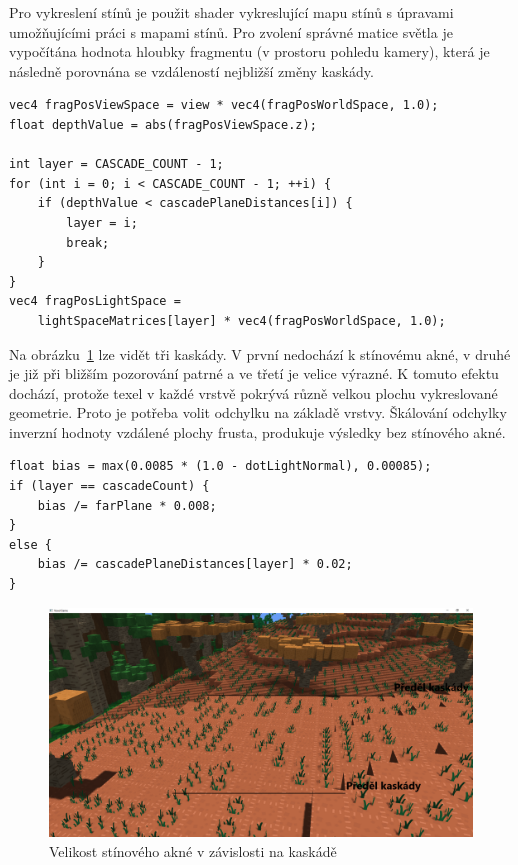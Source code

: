 \documentclass[thesis=M,czech]{FITthesis}[2019/12/23]
\begin{document}
Pro vykreslení stínů je použit shader vykreslující mapu stínů s úpravami umožňujícími práci s mapami stínů. Pro zvolení správné matice světla je vypočítána hodnota hloubky fragmentu (v prostoru pohledu kamery), která je následně porovnána se vzdáleností nejbližší změny kaskády.

\begin{verbatim}
vec4 fragPosViewSpace = view * vec4(fragPosWorldSpace, 1.0);
float depthValue = abs(fragPosViewSpace.z);

int layer = CASCADE_COUNT - 1;
for (int i = 0; i < CASCADE_COUNT - 1; ++i) {
    if (depthValue < cascadePlaneDistances[i]) {
        layer = i;
        break;
    }
}
vec4 fragPosLightSpace = 
    lightSpaceMatrices[layer] * vec4(fragPosWorldSpace, 1.0);
\end{verbatim}

Na obrázku~\ref{fig:shadows_csm_acne} lze vidět tři kaskády. V první nedochází k stínovému akné, v druhé je již při bližším pozorování patrné a ve třetí je velice výrazné. K tomuto efektu dochází, protože texel v každé vrstvě pokrývá různě velkou plochu vykreslované geometrie. Proto je potřeba volit odchylku na základě vrstvy. Škálování odchylky inverzní hodnoty vzdálené plochy frusta, produkuje výsledky bez stínového akné.

\begin{verbatim}
float bias = max(0.0085 * (1.0 - dotLightNormal), 0.00085);
if (layer == cascadeCount) {
    bias /= farPlane * 0.008;
}
else {
    bias /= cascadePlaneDistances[layer] * 0.02;
}
\end{verbatim}

\begin{figure}\centering
	\includegraphics[width=\textwidth]{images/shadows/csm_acne}
	\caption[Velikost stínového akné v závislosti na kaskádě]{Velikost stínového akné v závislosti na kaskádě}\label{fig:shadows_csm_acne}
\end{figure}
\end{document}

